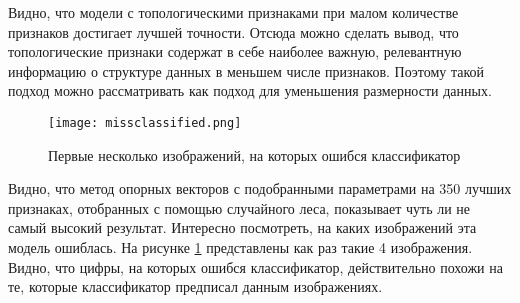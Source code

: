 Видно, что модели с топологическими признаками при малом количестве признаков достигает лучшей точности. Отсюда можно сделать вывод, что топологические признаки содержат в себе наиболее важную, релевантную информацию о структуре данных в меньшем числе признаков. Поэтому такой подход можно рассматривать как подход для уменьшения размерности данных. 

\begin{figure}[!htbp]
	\begin{center}
		\texttt{[image: missclassified.png]}\\
		\caption{Первые несколько изображений, на которых ошибся классификатор}
		\label{missclassified}
	\end{center}
\end{figure}

Видно, что метод опорных векторов с подобранными параметрами на 350 лучших признаках, отобранных с помощью случайного леса, показывает чуть ли не самый высокий результат. Интересно посмотреть, на каких изображений эта модель ошиблась. На рисунке \ref{missclassified} представлены как раз такие 4 изображения. Видно, что цифры, на которых ошибся классификатор, действительно похожи на те, которые классификатор предписал данным изображениях.
